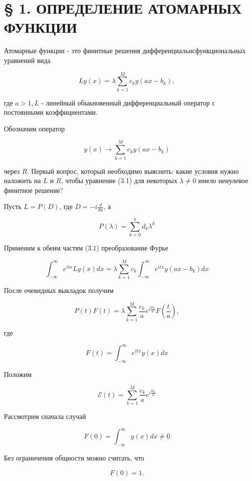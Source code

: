 \documentclass[10pt]{article}
\begin{document}
\section*{§ 1. ОПРЕДЕЛЕНИЕ АТОМАРНЫХ ФУНКЦИИ}
Атомарные функции - это финитные решения дифференциальнсфункциональных уравнений вида


\begin{equation*}
L y(x)=\lambda \sum_{k=1}^{M} c_{k} y\left(a x-b_{k}\right), \tag{3.1}
\end{equation*}


где $a>1, L$ - линейный обыкновенный дифференциальный оператор с постоянными коэффициентами.

Обозначим оператор

$$
y(x) \rightarrow \sum_{k=1}^{M} c_{k} y\left(a x-b_{k}\right)
$$

через $R$. Первый вопрос, который необходимо выяснить: какие условия нужно наложить на $L$ и $R$, чтобы уравнение (3.1) для некоторых $\lambda \neq 0$ имело ненулевое финитное решение?

Пусть $L=P(D)$, где $D=-i \frac{d}{d x}$, а

$$
P(\lambda)=\sum_{k=0}^{n} d_{k} \lambda^{k}
$$

Применим к обеим частям (3.1) преобразование Фурье

$$
\int_{-\infty}^{\infty} e^{i t x} L y(x) d x=\lambda \sum_{k=1}^{M} c_{k} \int_{-\infty}^{\infty} e^{i t x} y\left(a x-b_{k}\right) d x
$$

После очевидных выкладок получим


\begin{equation*}
P(t) F(t)=\lambda \sum_{k=1}^{M} \frac{c_{k}}{a} e^{i \frac{t b_{k}}{a}} F\left(\frac{t}{a}\right), \tag{3.2}
\end{equation*}


где

$$
F(t)=\int_{-\infty}^{\infty} e^{i t x} y(x) d x
$$

Положим

$$
\mathscr{E}(t)=\sum_{k=1}^{M} \frac{c_{k}}{a} e^{i \frac{t b_{k}}{a}}
$$

Рассмотрим сначала случай

$$
F(0)=\int_{-\infty}^{\infty} y(x) d x \neq 0
$$

Без ограничения общности можно считать, что


\begin{equation*}
F(0)=1 . \tag{3.3}
\end{equation*}
\end{document}
